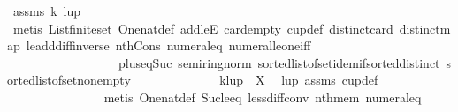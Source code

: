 \begin{isabellebody}
\ assms{\isacharparenleft}{\kern0pt}{}{\isacharparenright}{\kern0pt}\ k{}{\isacharparenleft}{\kern0pt}{}{\isacharparenright}{\kern0pt}\ lup\isanewline
\ \ \ \ \ \ \ \ \ \ \ \ \ \ \isamarkupfalse%
\ {\isacharparenleft}{\kern0pt}metis\ List{\isachardot}{\kern0pt}finite{\isacharunderscore}{\kern0pt}set\ One{\isacharunderscore}{\kern0pt}nat{\isacharunderscore}{\kern0pt}def\ add{\isacharunderscore}{\kern0pt}leE\ card{\isachardot}{\kern0pt}empty\ cup{\isacharunderscore}{\kern0pt}def\ distinct{\isacharunderscore}{\kern0pt}card\ distinct{\isacharunderscore}{\kern0pt}map\ le{\isacharunderscore}{\kern0pt}add{\isacharunderscore}{\kern0pt}diff{\isacharunderscore}{\kern0pt}inverse\ nth{\isacharunderscore}{\kern0pt}Cons{\isacharunderscore}{\kern0pt}{}\ numeral{\isacharunderscore}{\kern0pt}{}{\isacharunderscore}{\kern0pt}eq{\isacharunderscore}{\kern0pt}{}\ numeral{\isacharunderscore}{\kern0pt}le{\isacharunderscore}{\kern0pt}one{\isacharunderscore}{\kern0pt}iff\isanewline
\ \ \ \ \ \ \ \ \ \ \ \ \ \ \ \ \ \ plus{\isacharunderscore}{\kern0pt}{}{\isacharunderscore}{\kern0pt}eq{\isacharunderscore}{\kern0pt}Suc\ semiring{\isacharunderscore}{\kern0pt}norm{\isacharparenleft}{\kern0pt}{}{}{\isacharparenright}{\kern0pt}\ sorted{\isacharunderscore}{\kern0pt}list{\isacharunderscore}{\kern0pt}of{\isacharunderscore}{\kern0pt}set{\isachardot}{\kern0pt}idem{\isacharunderscore}{\kern0pt}if{\isacharunderscore}{\kern0pt}sorted{\isacharunderscore}{\kern0pt}distinct\ sorted{\isacharunderscore}{\kern0pt}list{\isacharunderscore}{\kern0pt}of{\isacharunderscore}{\kern0pt}set{\isacharunderscore}{\kern0pt}nonempty{\isacharparenright}{\kern0pt}\isanewline
\ \ \ \ \ \ \ \ \ \ \ \ \isamarkupfalse%
\ k{}{\isacharcolon}{\kern0pt}{\isachardoublequoteopen}lup{\isacharbang}{\kern0pt}{}\ {\isasymin}\ X{\isachardoublequoteclose}\ \isamarkupfalse%
\ lup\ assms{\isacharparenleft}{\kern0pt}{}{\isacharparenright}{\kern0pt}\ cup{\isacharunderscore}{\kern0pt}def\isanewline
\ \ \ \ \ \ \ \ \ \ \ \ \ \ \isamarkupfalse%
\ {\isacharparenleft}{\kern0pt}metis\ One{\isacharunderscore}{\kern0pt}nat{\isacharunderscore}{\kern0pt}def\ Suc{\isacharunderscore}{\kern0pt}le{\isacharunderscore}{\kern0pt}eq\ less{\isacharunderscore}{\kern0pt}diff{\isacharunderscore}{\kern0pt}conv\ nth{\isacharunderscore}{\kern0pt}mem\ numeral{\isacharunderscore}{\kern0pt}{}{\isacharunderscore}{\kern0pt}eq{\isacharunderscore}{\kern0pt}{}\isanewline

\end{isabellebody}
